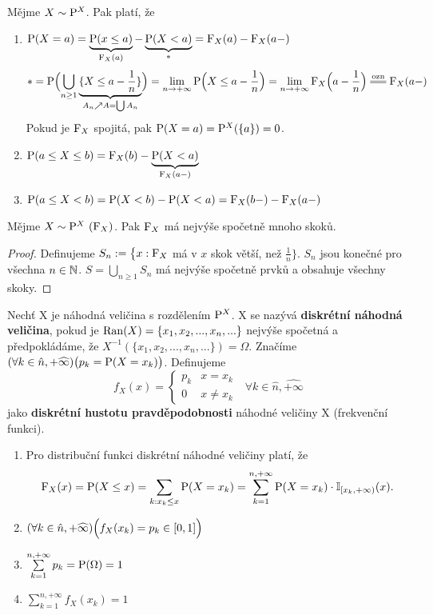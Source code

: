 \begin{remark} Mějme $X\sim \mathrm{P}^X$. Pak platí, že 
	\begin{enumerate}
		\item 	
		$ \mathrm{P}(X=a)=\underbrace{\mathrm{P}(x\leq a)}_{\mathrm{F}_X(a)}-\underbrace{\mathrm{P}(X<a)}_{*} = \mathrm{F}_X(a)-\mathrm{F}_X(a-) $ 
		$$ * = \PP\Bigl( \bigcup\limits_{n\geq 1}\underbrace{\{ X \leq a - \frac{1}{n} \}}_{A_n \nearrow A=\bigcup A_n} \Bigr)=\lim\limits_{n\to +\infty}\PP\Bigl( X \leq a - \frac{1}{n} \Bigr)=\lim\limits_{n\to +\infty}\FF_X\Bigl( a - \frac{1}{n} \Bigr) \equal{\text{ozn}}\FF_X(a-) $$ 
		Pokud je $\mathrm{F}_X$ spojitá, pak $\mathrm{P}(X=a)=\mathrm{P}^X(\{a \})=0$.
		\item $ \mathrm{P}(a\leq X \leq b)=\mathrm{F}_X(b)-\underbrace{\mathrm{P}(X<a)}_{\mathrm{F}_X(a-)} $
		\item $ \mathrm{P}(a\leq X < b)=\mathrm{P}(X<b)-\mathrm{P}(X<a)=\mathrm{F}_X(b-)-\mathrm{F}_X(a-) $
	\end{enumerate}
\end{remark}
\begin{theorem}
	Mějme $X\sim \mathrm{P}^X~ (\mathrm{F}_X)$. Pak $\mathrm{F}_X$ má nejvýše spočetně mnoho skoků.
	\begin{proof}
		Definujeme $S_n:=\bigl\{ x:\mathrm{F}_X $ má v $x$ skok větší, než $ \frac{1}{n} \bigr\}$. $S_n$ jsou konečné pro všechna $n\in\mathbb{N}$.
		$ S=\bigcup\limits_{n\geq 1}S_n $ má nejvýše spočetně prvků a obsahuje všechny skoky.
	\end{proof}
\end{theorem}
\begin{define} \label{diskretka}
	Nechť X je náhodná veličina s rozdělením $\mathrm{P}^X$. X se nazývá \textbf{diskrétní náhodná veličina}, pokud je $\mathop{\mathrm{Ran}}(X) = \{ x_1,x_2,...,x_n,... \}$ nejvýše spočetná a předpokládáme, že $X^{-1}(\{ x_1,x_2,...,x_n,... \})=\Omega$. Značíme $(\forall k \in \hat{n},+\widehat{\infty})\bigl(p_k = \mathrm{P}(X=x_k)\bigr)$. Definujeme
	\[
	f_X(x)=
	\begin{cases}
	p_k & x=x_k \\
	0 & x \neq x_k
	\end{cases} ~~~\forall k \in \hat{n},\widehat{+\infty}
	\]
	jako \textbf{diskrétní hustotu pravděpodobnosti} náhodné veličiny X (frekvenční funkci). \begin{remark}
	\begin{enumerate}
		\item 	Pro distribuční funkci diskrétní náhodné veličiny platí, že
	$$ \mathrm{F}_X(x)=\mathrm{P}(X\leq x)=\sum\limits_{k: x_k\leq x}\mathrm{P}(X=x_k)= \sum\limits_{k=1}^{n,+\infty}\mathrm{P}(X=x_k)\cdot \mathbb{I}_{[x_k,+\infty)}(x). $$
	\item $(\forall k\in\hat{n},+\widehat{\infty})\Bigl(f_X(x_k)=p_k\in [0,1]\Bigr)$
	\item $ \sum\limits_{k=1}^{n,+\infty}p_k=\mathrm{P}(\Omega)=1$
	\item $\sum\limits_{k=1}^{n,+\infty}f_X(x_k)=1 $
	\end{enumerate}
	\end{remark}
\end{define}
